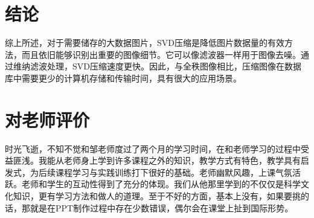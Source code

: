 \documentclass{hfutpaper}
\begin{document}
\section{结论}
综上所述，对于需要储存的大数据图片，SVD压缩是降低图片数据量的有效方法，而且依旧能够识别出重要的图像细节。它可以像滤波器一样用于图像去噪\cite{kolev2021big}。通过维纳滤波处理，SVD压缩速度更快。因此，与全秩图像相比，压缩图像在数据库中需要更少的计算机存储和传输时间，具有很大的应用场景。

\clearpage




\clearpage

\section{对老师评价}

时光飞逝，不知不觉和邹老师度过了两个月的学习时间，在和老师学习的过程中受益匪浅。我能从老师身上学到许多课程之外的知识，教学方式有特色，教学具有启发式，为后续课程学习与实践训练打下很好的基础。老师幽默风趣，上课气氛活跃。老师和学生的互动性得到了充分的体现。我们从他那里学到的不仅仅是科学文化知识，更有学习方法和做人的道理。至于不好的方面，基本上没有，如果要挑的话，那就是在PPT制作过程中存在少数错误，偶尔会在课堂上扯到国际形势。
\end{document}
